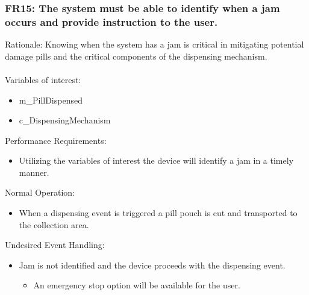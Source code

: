 \documentclass[12pt]{article}
\begin{document}
\subsubsection*{FR15: The system must be able to identify when a jam occurs and provide instruction to the user.}
Rationale: Knowing when the system has a jam is critical in mitigating potential damage pills and the critical components of the dispensing mechanism.
\\\\
Variables of interest:
\begin{itemize}[noitemsep,topsep=0pt]
    \item m\_PillDispensed
    \item c\_DispensingMechanism
\end{itemize} 
\bigskip
Performance Requirements:
\begin{itemize}[noitemsep,topsep=0pt]
    \item Utilizing the variables of interest the device will identify a jam in a timely manner.
\end{itemize}
\bigskip
Normal Operation:
\begin{itemize}[noitemsep,topsep=0pt]
    \item When a dispensing event is triggered a pill pouch is cut and transported to the collection area.
\end{itemize}
\bigskip
Undesired Event Handling:
\begin{itemize}[noitemsep,topsep=0pt]
    \item Jam is not identified and the device proceeds with the dispensing event.
    \begin{itemize}
        \item An emergency stop option will be available for the user.
    \end{itemize}
\end{itemize}
\bigskip

\end{document}
